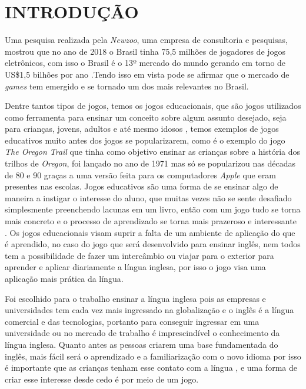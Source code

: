 
\chapter{INTRODUÇÃO}
\label{chap:introducao}

Uma pesquisa realizada pela \textit{Newzoo}, uma empresa de consultoria e pesquisas, mostrou que no ano de 2018 o Brasil tinha 75,5 milhões de jogadores de jogos eletrônicos, com isso o Brasil é o 13º mercado do mundo gerando em torno de US\$1,5 bilhões por ano \cite{NEWZOO18}.Tendo isso em vista pode se afirmar que o mercado de \textit{games} tem emergido e se tornado um dos mais relevantes no Brasil. 


Dentre tantos tipos de jogos, temos os jogos educacionais, que são jogos utilizados como ferramenta para ensinar um conceito sobre algum assunto desejado, seja para crianças, jovens, adultos e até mesmo idosos \cite{Rabin2009}, temos exemplos de jogos educativos muito antes dos jogos se popularizarem, como é o exemplo do jogo \textit{The Oregon Trail} que tinha como objetivo ensinar as crianças sobre a história dos trilhos de \textit{Oregon}, foi lançado no ano de 1971 mas só se popularizou nas décadas de 80 e 90 graças a uma versão feita para os computadores \textit{Apple} que eram presentes nas escolas. Jogos educativos são uma forma de se ensinar algo de maneira a instigar o interesse do aluno, que muitas vezes não se sente desafiado simplesmente preenchendo lacunas em um livro, então com um jogo tudo se torna mais concreto e o processo de aprendizado se torna mais prazeroso e interessante \cite{Joceline2006}. Os jogos educacionais visam suprir a falta de um ambiente de aplicação do que é aprendido\cite{Valente98}, no caso do jogo que será desenvolvido para ensinar inglês, nem todos tem a possibilidade de fazer um intercâmbio ou viajar para o exterior para aprender e aplicar diariamente a língua inglesa, por isso o jogo visa uma aplicação mais prática da língua.

Foi escolhido para o trabalho ensinar a língua inglesa pois as empresas e universidades tem cada vez mais ingressado na globalização e o inglês é a língua comercial e das tecnologias, portanto para conseguir ingressar em uma universidade ou no mercado de trabalho é imprescindível o conhecimento da língua inglesa. Quanto antes as pessoas criarem uma base fundamentada do inglês, mais fácil será o aprendizado e a familiarização com o novo idioma por isso é importante que as crianças tenham esse contato com a língua \cite{Medina2013}, e uma forma de criar esse interesse desde cedo é por meio de um jogo.

